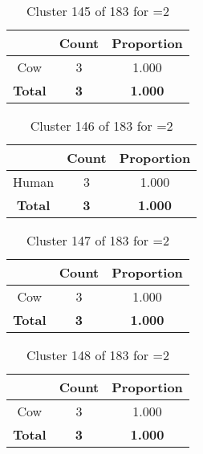 \begin{table}[ht!]
\centering
\begin{tabular}{|c|c|c|}
\hline
\bf \Spec{} &\bf Count &\bf Proportion\\ \hline \hline
Cow & 3 & 1.000\\ \hline
\hline
\bf Total & \bf 3 & \bf 1.000\\ \hline
\end{tabular}
\label{tab:cluster:145:2}
\caption{Cluster 145 of 183 for \minneigh{}=2}
\end{table}

\begin{table}[ht!]
\centering
\begin{tabular}{|c|c|c|}
\hline
\bf \Spec{} &\bf Count &\bf Proportion\\ \hline \hline
Human & 3 & 1.000\\ \hline
\hline
\bf Total & \bf 3 & \bf 1.000\\ \hline
\end{tabular}
\label{tab:cluster:146:2}
\caption{Cluster 146 of 183 for \minneigh{}=2}
\end{table}

\begin{table}[ht!]
\centering
\begin{tabular}{|c|c|c|}
\hline
\bf \Spec{} &\bf Count &\bf Proportion\\ \hline \hline
Cow & 3 & 1.000\\ \hline
\hline
\bf Total & \bf 3 & \bf 1.000\\ \hline
\end{tabular}
\label{tab:cluster:147:2}
\caption{Cluster 147 of 183 for \minneigh{}=2}
\end{table}

\begin{table}[ht!]
\centering
\begin{tabular}{|c|c|c|}
\hline
\bf \Spec{} &\bf Count &\bf Proportion\\ \hline \hline
Cow & 3 & 1.000\\ \hline
\hline
\bf Total & \bf 3 & \bf 1.000\\ \hline
\end{tabular}
\label{tab:cluster:148:2}
\caption{Cluster 148 of 183 for \minneigh{}=2}
\end{table}

